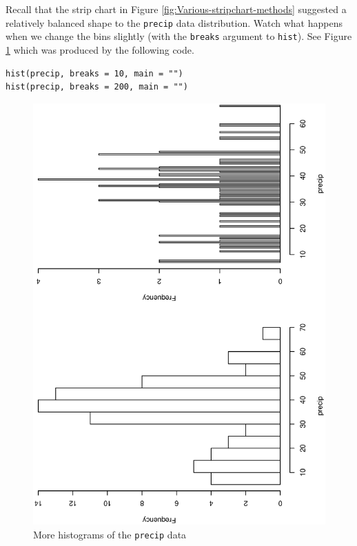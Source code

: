 \documentclass[captions=tableheading]{scrbook}
\begin{document}
\begin{example}
Recall that the strip chart in Figure \ref{fig:Various-stripchart-methods} suggested a relatively balanced shape to the \texttt{precip} data distribution. Watch what happens when we change the bins slightly (with the \texttt{breaks} argument to \texttt{hist}). See Figure \ref{fig:histograms-bins} which was produced by the following code.



\begin{verbatim}
hist(precip, breaks = 10, main = "")
hist(precip, breaks = 200, main = "")
\end{verbatim}





\begin{figure}[th]
    \includegraphics[angle=270, totalheight=4in]{img/histograms-bins.ps}
    \caption{More histograms of the \texttt{precip} data}
    \label{fig:histograms-bins}
  \end{figure}


\end{example}
\end{document}
